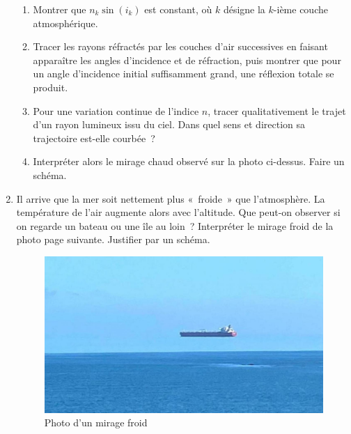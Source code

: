 \documentclass[../../main/main.tex]{subfiles}
\begin{document}
\begin{enumerate}
\begin{minipage}{0.47\linewidth}
\begin{center}
			      \label{fig:mirage_plain}
		      \end{center}
	      \end{minipage}
	      \begin{enumerate}
		      \item Montrer que $n_k\sin(i_k)$ est constant, où $k$ désigne la
		            $k$-ième couche atmosphérique.
		      \item Tracer les rayons réfractés par les couches d'air successives en
		            faisant apparaître les angles d'incidence et de réfraction, puis
		            montrer que pour un angle d'incidence initial suffisamment grand,
		            une réflexion totale se produit.
		      \item Pour une variation continue de l'indice $n$, tracer
		            qualitativement le trajet d'un rayon lumineux issu du ciel. Dans
		            quel sens et direction sa trajectoire est-elle courbée~?
		      \item Interpréter alors le mirage chaud observé sur la photo ci-dessus.
		            Faire un schéma.
	      \end{enumerate}

	\item Il arrive que la mer soit nettement plus «~froide~» que l'atmosphère.
	      La température de l'air augmente alors avec l'altitude. Que peut-on
	      observer si on regarde un bateau ou une île au loin~? Interpréter le
	      mirage froid de la photo page suivante. Justifier par un schéma.
	      \begin{figure}[h]
		      \centering
		      \includegraphics[width=.5\linewidth]{mirage_froid}
		      \captionsetup{justification=centering}
		      \caption{Photo d'un mirage froid}
		      \label{fig:mir_froid}
	      \end{figure}
\end{enumerate}
\end{document}
